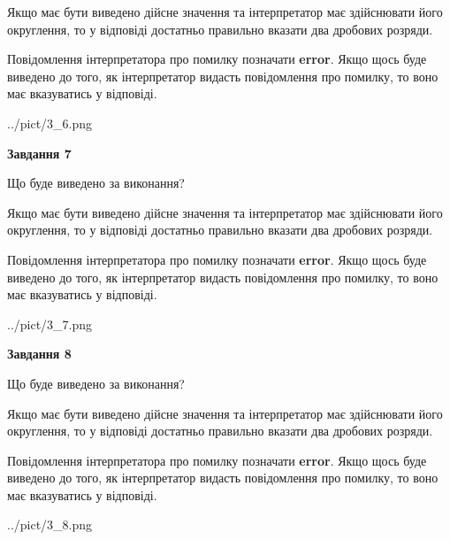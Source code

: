 \documentclass[12pt, ukrainian]{article}
\begin{document}
{\begin {Large}
Якщо має бути виведено дійсне значення та інтерпретатор має здійснювати його округлення, 
то у відповіді достатньо правильно вказати два дробових розряди.

Повідомлення інтерпретатора про помилку позначати \textbf{error}.
Якщо щось буде виведено до того, як інтерпретатор видасть повідомлення про помилку, 
то воно має вказуватись у відповіді. \par

\begin{center}
	{../pict/3_6.png}
\end{center}
\newpage

{\begin {center}\textbf{Завдання 7}\end {center}}\par
Що буде виведено за виконання? \par

Якщо має бути виведено дійсне значення та інтерпретатор має здійснювати його округлення, 
то у відповіді достатньо правильно вказати два дробових розряди.

Повідомлення інтерпретатора про помилку позначати \textbf{error}.
Якщо щось буде виведено до того, як інтерпретатор видасть повідомлення про помилку, 
то воно має вказуватись у відповіді. \par

\begin{center}
	{../pict/3_7.png}
\end{center}
\newpage

{\begin {center}\textbf{Завдання 8}\end {center}}\par
Що буде виведено за виконання? \par

Якщо має бути виведено дійсне значення та інтерпретатор має здійснювати його округлення, 
то у відповіді достатньо правильно вказати два дробових розряди.

Повідомлення інтерпретатора про помилку позначати \textbf{error}.
Якщо щось буде виведено до того, як інтерпретатор видасть повідомлення про помилку, 
то воно має вказуватись у відповіді. \par

\begin{center}
	{../pict/3_8.png}
\end{center}
\newpage


\end{Large}}
\end{document}
